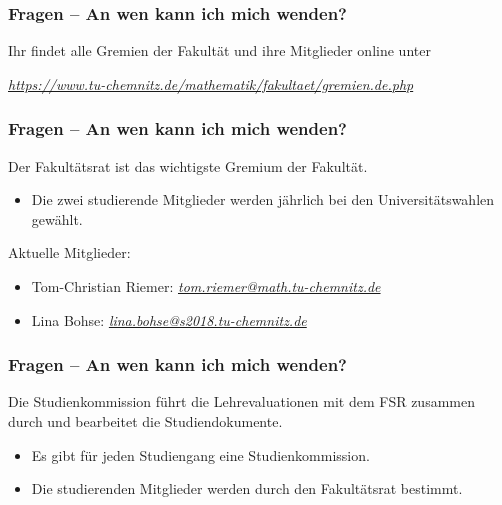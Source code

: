 \documentclass[10pt]{beamer}
\makeatletter
\newcommand{\highl}[1]{\color{tuccolor@ma}#1\color{black}}
\makeatother
\begin{document}
\begin{frame}
	\frametitle{Fragen -- An wen kann ich mich wenden?}

	Ihr findet alle Gremien der Fakultät und ihre Mitglieder online unter 

	\vspace*{1.0cm}

	\begin{center}
		\highl{\textit{\href{https://www.tu-chemnitz.de/mathematik/fakultaet/gremien.de.php}{https://www.tu-chemnitz.de/mathematik/fakultaet/gremien.de.php}}}
	\end{center}
\end{frame}

\begin{frame}
	\frametitle{Fragen -- An wen kann ich mich wenden?}

	\begin{block}{\vphantom{X}}
		Der Fakultätsrat ist das wichtigste Gremium der Fakultät.
	\end{block}

	\begin{itemize}
		\item Die zwei studierende Mitglieder werden jährlich bei den Universitätswahlen gewählt.
	\end{itemize} 

	\vspace*{1.0cm}

	Aktuelle Mitglieder:

	\begin{itemize}
		\item Tom-Christian Riemer: \highl{\textit{\href{mailto:tom.riemer@math.tu-chemnitz.de}{tom.riemer@math.tu-chemnitz.de}}}
		\item Lina Bohse: \highl{\textit{\href{mailto:lina.bohse@s2018.tu-chemnitz.de}{lina.bohse@s2018.tu-chemnitz.de}}}
	\end{itemize}
\end{frame}

\begin{frame}
	\frametitle{Fragen -- An wen kann ich mich wenden?}

	\begin{block}{\vphantom{X}}
		Die Studienkommission führt die Lehrevaluationen mit dem FSR zusammen durch und bearbeitet die Studiendokumente.
	\end{block}

	\begin{itemize}
		\item Es gibt für jeden Studiengang eine Studienkommission.
		\item Die studierenden Mitglieder werden durch den Fakultätsrat bestimmt.
	\end{itemize}
\end{frame}
\end{document}
